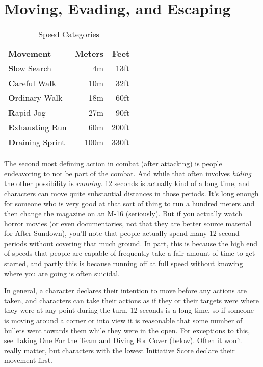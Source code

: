 \section{Moving, Evading, and Escaping}

\begin{wraptable}[9]{R}{6.5cm} \vspace{-.5cm}
 \caption{Speed Categories} \centering
\begin{tabular}{l r r}
\textbf{Movement} & \textbf{Meters} & \textbf{Feet}\\
\textbf{S}low Search & 4m & 13ft\\
\textbf{C}areful Walk & 10m & 32ft\\
\textbf{O}rdinary Walk & 18m & 60ft\\
\textbf{R}apid Jog & 27m & 90ft\\
\textbf{E}xhausting Run & 60m & 200ft\\
\textbf{D}raining Sprint & 100m & 330ft\\
\end{tabular}
\end{wraptable}

The second most defining action in combat (after attacking) is people endeavoring to not be part of the combat. And while that often involves \textit{hiding} the other possibility is \textit{running}. 12 seconds is actually kind of a long time, and characters can move quite substantial distances in those periods. It's long enough for someone who is very good at that sort of thing to run a hundred meters and then change the magazine on an M-16 (seriously). But if you actually watch horror movies (or even documentaries, not that they are better source material for After Sundown), you'll note that people actually spend many 12 second periods without covering that much ground. In part, this is because the high end of speeds that people are capable of frequently take a fair amount of time to get started, and partly this is because running off at full speed without knowing where you are going is often suicidal.

In general, a character declares their intention to move before any actions are taken, and characters can take their actions as if they or their targets were where they were at any point during the turn. 12 seconds is a long time, so if someone is moving around a corner or into view it is reasonable that some number of bullets went towards them while they were in the open. For exceptions to this, see Taking One For the Team and Diving For Cover (below). Often it won't really matter, but characters with the lowest Initiative Score declare their movement first.

